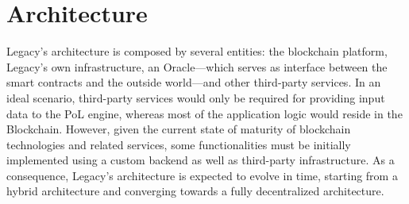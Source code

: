 
\section{Architecture} %
\label{sec:architecture}
Legacy’s architecture is composed by several entities: the blockchain platform, Legacy’s own infrastructure, an Oracle---which serves as interface between the smart contracts and the outside world---and other third-party services. In an ideal scenario, third-party services would only be required for providing input data to the PoL engine, whereas most of the application logic would reside in the Blockchain. However, given the current state of maturity of blockchain technologies and related services, some functionalities must be initially implemented using a custom backend as well as third-party infrastructure. As a consequence, Legacy’s architecture is expected to evolve in time, starting from a hybrid architecture and converging towards a fully decentralized architecture.

